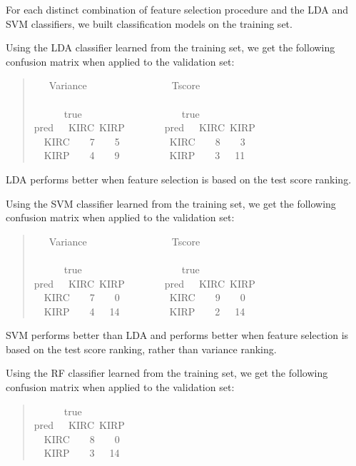For each distinct combination of feature selection procedure and the LDA and
SVM classifiers, we built classification models on the training set.

Using the LDA classifier learned from the training set, we get the following
confusion matrix when applied to the validation set:

\begin{quote}{  \ttfamily \raggedright \noindent
\centering
~~~Variance~~~~~~~~~~~~~~~~~Tscore\\
~\\
~~~~~~true~~~~~~~~~~~~~~~~~~~~true\\
pred~~~KIRC~KIRP~~~~~~~~pred~~~KIRC~KIRP\\
~~KIRC~~~~7~~~~5~~~~~~~~~~KIRC~~~~8~~~~3\\
~~KIRP~~~~4~~~~9~~~~~~~~~~KIRP~~~~3~~~11\\
}
\end{quote}

LDA performs better when feature selection is based on the test score ranking.

Using the SVM classifier learned from the training set, we get the following
confusion matrix when applied to the validation set:

\begin{quote}{ \ttfamily \raggedright \noindent
\centering
~~~Variance~~~~~~~~~~~~~~~~~Tscore\\
~\\
~~~~~~true~~~~~~~~~~~~~~~~~~~~true\\
pred~~~KIRC~KIRP~~~~~~~~pred~~~KIRC~KIRP\\
~~KIRC~~~~7~~~~0~~~~~~~~~~KIRC~~~~9~~~~0\\
~~KIRP~~~~4~~~14~~~~~~~~~~KIRP~~~~2~~~14\\
}
\end{quote}

SVM performs better than LDA and performs better when feature selection is
based on the test score ranking, rather than variance ranking.

Using the RF classifier learned from the training set, we get the following
confusion matrix when applied to the validation set:

\begin{quote}{ \ttfamily \raggedright \noindent
\centering
~~~~~~true\\
pred~~~KIRC~KIRP\\
~~KIRC~~~~8~~~~0\\
~~KIRP~~~~3~~~14\\
}
\end{quote}

